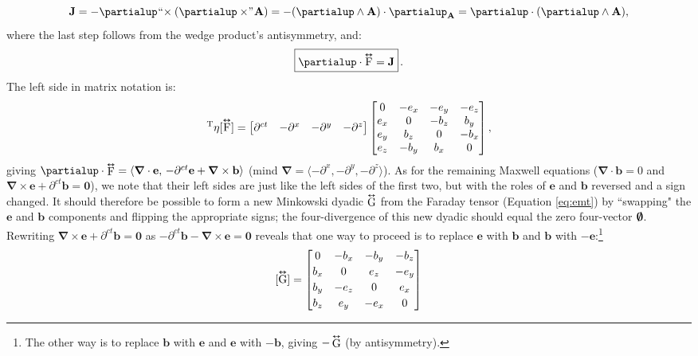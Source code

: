 \documentclass[12pt]{article}
\renewcommand{\vv}[1]{\mathbf{#1}}
\newcommand{\del}{\boldsymbol{\nabla}}
\newcommand{\tightoverset}[2]{%
  \mathop{#2}\limits^{\vbox to -.5ex{\kern-0.75ex\hbox{$#1$}\vss}}}
\newcommand{\inlinedy}[1]{\tightoverset{\text{\tiny$\bm\leftrightarrow$}}{#1}}
\newcommand{\fnoverset}[2]{%
  \mathop{#2}\limits^{\vbox to -.5ex{\kern-0.85ex\hbox{$#1$}\vss}}}
\newcommand{\footnotedy}[1]{\fnoverset{\text{\tiny$\bm\leftrightarrow$}}{#1}}
\newcommand{\capdy}[1]{ \overset{ \text{\tiny$\bm\leftrightarrow$} }{\vphantom{\text{\small{A}}}\smash{#1}} }
\begin{document}
\begin{equation*}
\vv J = - \partialup \mkern1mu `` \mkern-4mu \times ( \partialup \times \mkern-4mu " \mkern1mu \vv A ) = - ( \partialup \wedge \vv A ) \cdot \partialup_{\vv A} = \partialup \cdot (\partialup \wedge \vv A),
\end{equation*}
where the last step follows from the wedge product's antisymmetry, and:
\begin{equation}\label{eq:ime}
\boxed{ \vphantom{A_{A_A}} \partialup \cdot \capdy{\mathrm{F}} = \vv J } \, .
\end{equation}
The left side in matrix notation is:
\begin{equation*}
[\partialup]^{\mathrm{T}} \eta [\capdy{\mathrm{F}}]
=
\begin{bmatrix}
\partial^{ct} & - \partial^x & - \partial^y & - \partial^z
\end{bmatrix}
\begin{bmatrix}
0 & -e_x & -e_y & -e_z \\
e_x & 0 & -b_z & b_y \\
e_y & b_z & 0 & -b_x \\
e_z & -b_y & b_x & 0
\end{bmatrix} ,
\end{equation*}
giving $\partialup \cdot \inlinedy{\mathrm{F}} = \langle \del \cdot \vv e , \, - \partial^{ct} \vv e + \del \times \vv b \rangle$ (mind $\del = \langle - \partial^x , - \partial^y , - \partial^z \rangle$). As for the remaining Maxwell equations ($\del \cdot \vv b = 0$ and $\del \times \vv e + \partial^{ct} \vv b = \vv 0$), we note that their left sides are just like the left sides of the first two, but with the roles of $\vv e$ and $\vv b$ reversed and a sign changed. It should therefore be possible to form a new Minkowski dyadic $\inlinedy{\mathrm{G}}$ from the Faraday tensor (Equation \ref{eq:emt}) by ``swapping" the $\vv e$ and $\vv b$ components and flipping the appropriate signs; the four-divergence of this new dyadic should equal the zero four-vector $\textrm{\mbox{\boldmath $\emptyset$}}$. Rewriting $\del \times \vv e + \partial^{ct} \vv b = \vv 0$ as $- \partial^{ct} \vv b - \del \times \vv e = \vv 0$ reveals that one way to proceed is to replace $\vv e$ with $\vv b$ and $\vv b$ with $- \vv e$:\footnote{The other way is to replace $\vv b$ with $\vv e$ and $\vv e$ with $- \vv b$, giving $-\footnotedy{\mathrm{G}}$ (by antisymmetry).}
\begin{equation}\label{eq:mt}
[ \capdy{\mathrm{G}} ]
=
\begin{bmatrix}
0 & -b_x & -b_y & -b_z \\[.5ex]
b_x & 0 & e_z & -e_y \\[.5ex]
b_y & -e_z & 0 & e_x \\[.5ex]
b_z & e_y & -e_x & 0
\end{bmatrix}
\end{equation}
\end{document}
